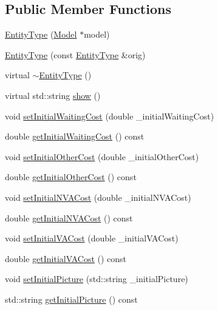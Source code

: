 \subsection*{Public Member Functions}
\begin{DoxyCompactItemize}
\item 
\hyperlink{class_entity_type_a76c09c732793a586dc3b474485e9824f}{Entity\-Type} (\hyperlink{class_model}{Model} $\ast$model)
\item 
\hyperlink{class_entity_type_a34b9576e2453ed309c75840319bbb2f8}{Entity\-Type} (const \hyperlink{class_entity_type}{Entity\-Type} \&orig)
\item 
virtual \hyperlink{class_entity_type_aee11e4242d000965f06018723bdf0946}{$\sim$\-Entity\-Type} ()
\item 
virtual std\-::string \hyperlink{class_entity_type_ab5a696912b12a9f51decded90f368dea}{show} ()
\item 
void \hyperlink{class_entity_type_affd1d2dd13149ae0989aae5cc9ea1e05}{set\-Initial\-Waiting\-Cost} (double \-\_\-initial\-Waiting\-Cost)
\item 
double \hyperlink{class_entity_type_a46dd0977b19bf167eeb12db97464b757}{get\-Initial\-Waiting\-Cost} () const 
\item 
void \hyperlink{class_entity_type_a32f126822c567a887a446a763db13d64}{set\-Initial\-Other\-Cost} (double \-\_\-initial\-Other\-Cost)
\item 
double \hyperlink{class_entity_type_ac5708811f5f6eaf7ac587fc88190b7f2}{get\-Initial\-Other\-Cost} () const 
\item 
void \hyperlink{class_entity_type_a935cac67adc2b13aa25290c3db04c847}{set\-Initial\-N\-V\-A\-Cost} (double \-\_\-initial\-N\-V\-A\-Cost)
\item 
double \hyperlink{class_entity_type_ae8b26deba82e687d5a07b863f750baf4}{get\-Initial\-N\-V\-A\-Cost} () const 
\item 
void \hyperlink{class_entity_type_aecd52de7178bb03be55798378d15d3e8}{set\-Initial\-V\-A\-Cost} (double \-\_\-initial\-V\-A\-Cost)
\item 
double \hyperlink{class_entity_type_a9833d4a85dcb5c5bd9db02e1e2e45dd9}{get\-Initial\-V\-A\-Cost} () const 
\item 
void \hyperlink{class_entity_type_ab3a19031f9b46b376bdd35aa3044c90e}{set\-Initial\-Picture} (std\-::string \-\_\-initial\-Picture)
\item 
std\-::string \hyperlink{class_entity_type_a9a464c546bc2f7fe56fbea9b761ac1f7}{get\-Initial\-Picture} () const 
\item 

\end{DoxyCompactItemize}
